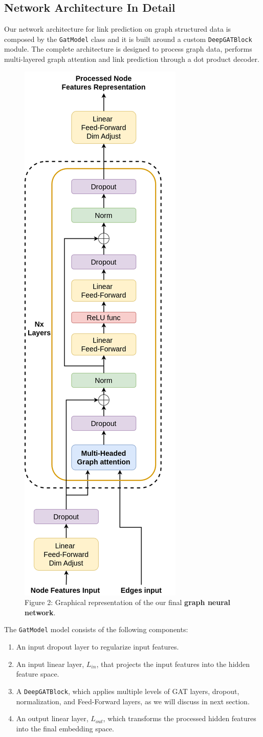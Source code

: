 \documentclass[11pt]{article}
\begin{document}
	\subsection{Network Architecture In Detail}
	Our network architecture for link prediction on graph structured data is composed by the \texttt{GatModel} class and it is built around a custom \texttt{DeepGATBlock} module.
	The complete architecture is designed to process graph data, performs multi-layered graph attention and link prediction through a dot product decoder.
	
	\begin{figure}[h] %
		\centering
		\label{figure_2}
		\includegraphics[height=0.8\textwidth]{images/custom_gnn_diagram.png}
		\caption{Figure 2: Graphical representation of the our final \textbf{graph neural network}.}
	\end{figure}
	
	The \texttt{GatModel} model consists of the following components:
	\begin{enumerate}
		\item An input dropout \cite{JMLR:v15:srivastava14a} layer to regularize input features.
		
		\item An input linear layer, $L_{in}$, that projects the input features into the hidden feature space.
		
		\item A \texttt{DeepGATBlock}, which applies multiple levels of GAT layers, dropout, normalization, and Feed-Forward layers, as we will discuss in next section.
		
		\item An output linear layer, $L_{out}$, which transforms the processed hidden features into the final embedding space.
	\end{enumerate}
	
\end{document}
